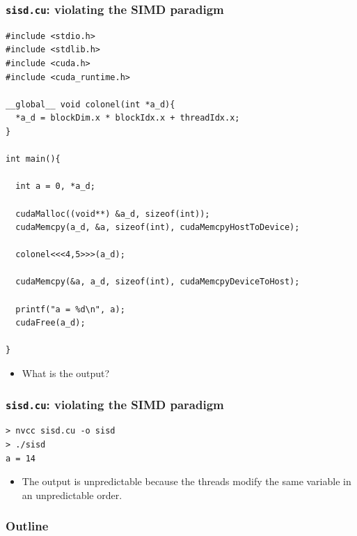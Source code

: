 \documentclass[handout]{beamer}
\numberwithin{equation}{section}
\begin{document}
\begin{frame}[fragile]
\frametitle{{\tt sisd.cu}: violating the SIMD paradigm} \lstset{basicstyle=\tiny}
\begin{lstlisting}
#include <stdio.h>
#include <stdlib.h>
#include <cuda.h>
#include <cuda_runtime.h> 

__global__ void colonel(int *a_d){
  *a_d = blockDim.x * blockIdx.x + threadIdx.x;
}

int main(){

  int a = 0, *a_d;
  
  cudaMalloc((void**) &a_d, sizeof(int));
  cudaMemcpy(a_d, &a, sizeof(int), cudaMemcpyHostToDevice);

  colonel<<<4,5>>>(a_d); 
  
  cudaMemcpy(&a, a_d, sizeof(int), cudaMemcpyDeviceToHost);

  printf("a = %d\n", a);
  cudaFree(a_d);

}
\end{lstlisting}

\begin{itemize}
\pause \item What is the output?
\end{itemize}
\end{frame}

\begin{frame}[fragile]
\frametitle{{\tt sisd.cu}: violating the SIMD paradigm}
\begin{lstlisting}
> nvcc sisd.cu -o sisd
> ./sisd
a = 14
\end{lstlisting}

\begin{itemize}
\pause \item The output is unpredictable because the threads modify the same variable in an unpredictable order.
\end{itemize}
\end{frame}

\begin{frame}
\frametitle{Outline}
\tableofcontents
\end{frame}
\end{document}
